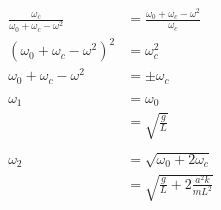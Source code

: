 \documentclass{article}
\begin{document}
\begin{enumerate}
        \begin{align*}
          \frac{\omega_c}{\omega_0 + \omega_c - \omega^2} & = \frac{\omega_0 + \omega_c - \omega^2}{\omega_c} \\
          (\omega_0 + \omega_c - \omega^2)^2              & = \omega_c^2                                      \\
          \omega_0 + \omega_c - \omega^2                  & = \pm \omega_c                                    \\ \\
          \omega_1                                        & = \omega_0                                        \\
                                                          & = \sqrt{\frac{g}{L}}                              \\ \\
          \omega_2                                        & = \sqrt{\omega_0 + 2 \omega_c}                    \\
                                                          & = \sqrt{\frac{g}{L} + 2 \frac{a^2 k}{m L^2}}
        \end{align*}
\end{enumerate}

\subsection{}
\end{document}
